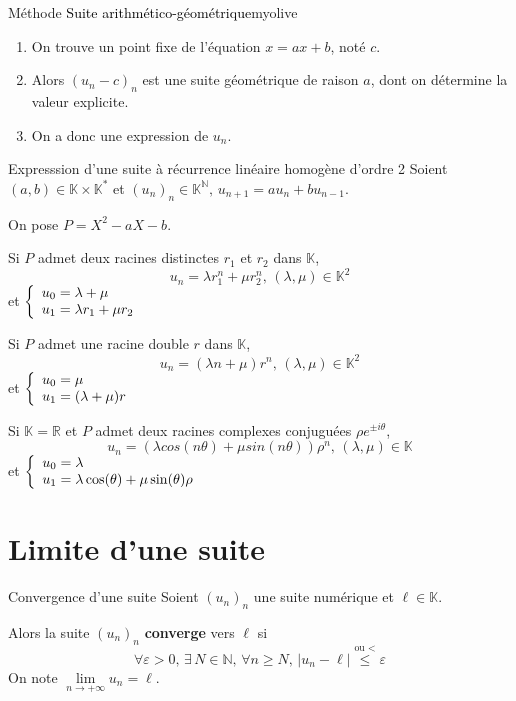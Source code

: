     \begin{omed}{Méthode \textcolor{black}{Suite arithmético-géométrique}}{myolive}
        \begin{enumerate}
            \item On trouve un point fixe de l’équation $x = ax + b$, noté $c$.
            \item Alors $(u_n - c)_n$ est une suite géométrique de raison $a$, dont on détermine la valeur explicite.
            \item On a donc une expression de $u_n$.
        \end{enumerate}
    \end{omed}

    \begin{prop}{Expresssion d’une suite à récurrence linéaire homogène d’ordre 2}{}
        Soient $(a,b) \in \mathbb{K} \times \mathbb{K}^*$ et $(u_n)_n \in \mathbb{K}^{\mathbb{N}}, \, u_{n+1} = au_n + bu_{n-1}$. 

        On pose $ P = X^2 -aX -b$. 

        \begin{alors}
            \item Si $P$ admet deux racines distinctes $r_1$ et $r_2$ dans $\mathbb{K}$,
            \[ u_n = \lambda r_1^n + \mu r_2^n, \, (\lambda, \mu) \in \mathbb{K}^2 \] et 
            $\et{u_0 = \lambda + \mu}{u_1 = \lambda r_1 + \mu r_2}$
            \item Si $P$ admet une racine double $r$ dans $\mathbb{K}$,
            \[ u_n = (\lambda n + \mu)r^n, \, (\lambda, \mu) \in \mathbb{K}^2 \] et 
            $\et{u_0 = \mu}{u_1 = (\lambda + \mu)r}$ 
            \item Si $\mathbb{K} = \mathbb{R}$ et $P$ admet deux racines complexes conjuguées $\rho e^{\pm i \theta}$,
            \[ u_n = (\lambda cos(n \theta)+ \mu sin(n \theta))\rho^n, \, (\lambda, \mu) \in \mathbb{K}\] et 
            $\et{u_0 = \lambda}{u_1 = \lambda \cos(\theta) + \mu \sin(\theta)\rho}$
        \end{alors}
    \end{prop}

\section{Limite d’une suite}

    \begin{defi}{Convergence d’une suite}{}
        Soient $(u_n)_n$ une suite numérique et $\ell \in \mathbb{K}$.

        Alors la suite $(u_n)_n$ \textbf{converge} vers $\ell$ si 
        \[ \forall \varepsilon > 0, \, \exists \, N \in \mathbb{N}, \, \forall n \geq N, \, |u_n-\ell| \overset{\text{ou } <}{\leq} \varepsilon\]
        On note $\lim\limits_{n \rightarrow +\infty} u_n = \ell$.
    \end{defi}

